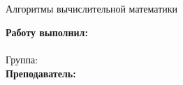 \begin{titlepage}	%

	\begin{center}		%

		\large \university \\
		\large \faculty \\
		\large \department \\[6cm]

		\huge \subject \\
		\large \docname \\
		\large Алгоритмы вычислительной математики\\[4cm]

	\end{center}


	\begin{flushright} %
		\begin{minipage}{0.33\textwidth} %
			\begin{flushleft} %

				\large\textbf{Работу выполнил:}\\
				\large \studentname \\
				\large {Группа:} \group \\

				\large \textbf{Преподаватель:}\\
				\large \tutorname

			\end{flushleft}
		\end{minipage}
	\end{flushright}

	\vfill %

	\begin{center}
		\large \city \\
		\large \the\year %
	\end{center} %

\end{titlepage} %

\vfill %
